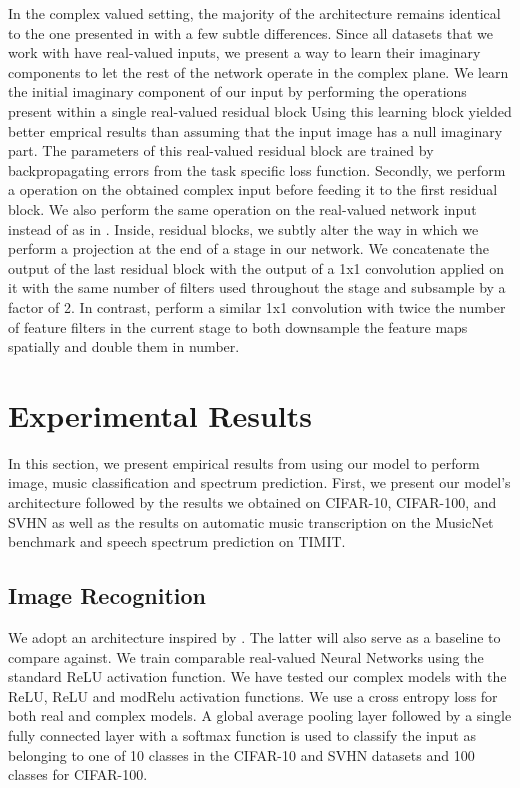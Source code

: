 \documentclass{article}
\begin{document}
In the complex valued setting, the majority of the architecture remains identical to the one presented in \cite{he2016identity} with a few subtle differences. 
Since all datasets that we work with have real-valued inputs, we present a way to learn their imaginary components to let the rest of the network operate in the complex plane. We learn the initial imaginary component of our input by performing the operations present within a single real-valued residual block
 Using this learning block yielded better emprical results than assuming that the input image has a null imaginary part. The parameters of this real-valued residual block are trained by backpropagating errors from the task specific loss function. Secondly, we perform a  operation on the obtained complex input before feeding it to the first residual block. We also perform the same operation on the real-valued network input instead of  as in \citet{he2016identity}. Inside, residual blocks, we subtly alter the way in which we perform a projection at the end of a stage in our network. We concatenate the output of the last residual block with the output of a 1x1 convolution applied on it with the same number of filters used throughout the stage and subsample by a factor of 2. In contrast, \citet{he2016identity} perform a similar 1x1 convolution with twice the number of feature filters in the current stage to both downsample the feature maps spatially and double them in number.

\section{Experimental Results}
In this section, we present empirical results from using our model to perform image, music classification and spectrum prediction. First, we present our model's architecture followed by the results we obtained on CIFAR-10, CIFAR-100, and SVHN as well as the results on automatic music transcription on the MusicNet benchmark and speech spectrum prediction on TIMIT.

\subsection{Image Recognition}
\label{arch_train}

We adopt an architecture inspired by \cite{he2016identity}. The latter will also serve as a baseline to compare against. We train comparable real-valued Neural Networks using the standard ReLU activation function. We have tested our complex models with the ReLU, ReLU and modRelu activation functions. We use a cross entropy loss for both real and complex models. A global average pooling layer followed by a single fully connected layer with a softmax function is used to classify the input as belonging to one of 10 classes in the CIFAR-10 and SVHN datasets and 100 classes for CIFAR-100.
\end{document}
